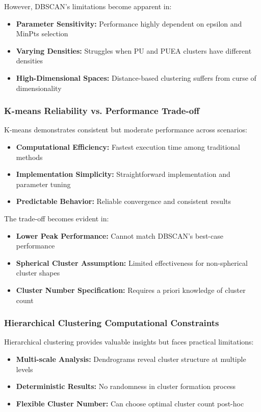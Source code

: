 However, DBSCAN's limitations become apparent in:
\begin{itemize}
\item \textbf{Parameter Sensitivity:} Performance highly dependent on epsilon and MinPts selection
\item \textbf{Varying Densities:} Struggles when PU and PUEA clusters have different densities
\item \textbf{High-Dimensional Spaces:} Distance-based clustering suffers from curse of dimensionality
\end{itemize}

\subsubsection{K-means Reliability vs. Performance Trade-off}
K-means demonstrates consistent but moderate performance across scenarios:
\begin{itemize}
\item \textbf{Computational Efficiency:} Fastest execution time among traditional methods
\item \textbf{Implementation Simplicity:} Straightforward implementation and parameter tuning
\item \textbf{Predictable Behavior:} Reliable convergence and consistent results
\end{itemize}

The trade-off becomes evident in:
\begin{itemize}
\item \textbf{Lower Peak Performance:} Cannot match DBSCAN's best-case performance
\item \textbf{Spherical Cluster Assumption:} Limited effectiveness for non-spherical cluster shapes
\item \textbf{Cluster Number Specification:} Requires a priori knowledge of cluster count
\end{itemize}

\subsubsection{Hierarchical Clustering Computational Constraints}
Hierarchical clustering provides valuable insights but faces practical limitations:
\begin{itemize}
\item \textbf{Multi-scale Analysis:} Dendrograms reveal cluster structure at multiple levels
\item \textbf{Deterministic Results:} No randomness in cluster formation process
\item \textbf{Flexible Cluster Number:} Can choose optimal cluster count post-hoc
\end{itemize}

